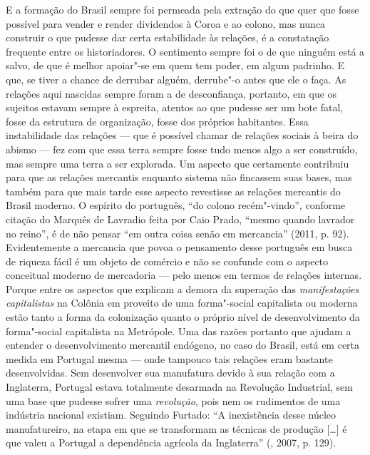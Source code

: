 E a formação do Brasil sempre foi permeada pela extração do que quer que
fosse possível para vender e render dividendos à Coroa e ao colono, mas
nunca construir o que pudesse dar certa estabilidade às relações, é a
constatação frequente entre os historiadores. O sentimento sempre foi o
de que ninguém está a salvo, de que é melhor apoiar"-se em quem tem
poder, em algum padrinho. E que, se tiver a chance de derrubar alguém,
derrube"-o antes que ele o faça. As relações aqui nascidas sempre foram a
de desconfiança, portanto, em que os sujeitos estavam sempre à espreita,
atentos ao que pudesse ser um bote fatal, fosse da estrutura de
organização, fosse dos próprios habitantes. Essa instabilidade das
relações --- que é possível chamar de relações sociais à beira do
abismo --- fez com que essa terra sempre fosse tudo menos algo a ser
construído, mas sempre uma terra a ser explorada. Um aspecto que
certamente contribuiu para que as relações mercantis enquanto sistema
não fincassem suas bases, mas também para que mais tarde esse aspecto revestisse
as relações mercantis do Brasil moderno. O espírito do português, ``do colono
recém"-vindo'', conforme citação do Marquês de Lavradio feita por Caio
Prado, ``mesmo quando lavrador no reino'', é de não pensar ``em outra
coisa senão em mercancia'' (2011, p. 92). Evidentemente a mercancia que
povoa o pensamento desse português em busca de riqueza fácil é um objeto
de comércio e não se confunde com o aspecto conceitual moderno de
mercadoria --- pelo menos em termos de relações internas. Porque entre os
aspectos que explicam a demora da superação das \emph{manifestações
capitalistas} na Colônia em proveito de uma forma"-social capitalista ou
moderna estão tanto a forma da colonização quanto o próprio nível de
desenvolvimento da forma"-social capitalista na Metrópole. Uma das razões
portanto que ajudam a entender o desenvolvimento mercantil endógeno, no
caso do Brasil, está em certa medida em Portugal mesma --- onde tampouco
tais relações eram bastante desenvolvidas. Sem desenvolver sua
manufatura devido à sua relação com a Inglaterra, Portugal estava
totalmente desarmada na Revolução Industrial, sem uma base que pudesse
sofrer uma \emph{revolução}, pois nem os rudimentos de uma indústria
nacional existiam. Seguindo Furtado: ``A inexistência desse núcleo
manufatureiro, na etapa em que se transformam as técnicas de produção
[\ldots{}] é que valeu a Portugal a dependência agrícola da Inglaterra''
(, 2007, p. 129).

